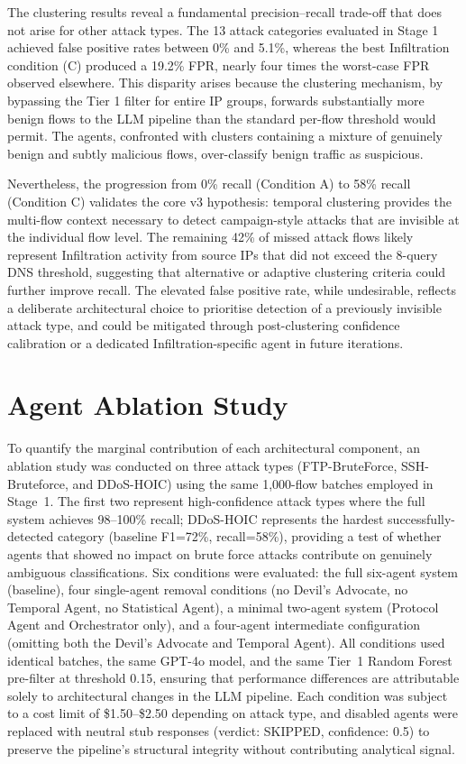 \documentclass[../main.tex]{subfiles}
\begin{document}
The clustering results reveal a fundamental precision--recall trade-off that does not arise for other attack types. The 13 attack categories evaluated in Stage 1 achieved false positive rates between 0\% and 5.1\%, whereas the best Infiltration condition (C) produced a 19.2\% FPR, nearly four times the worst-case FPR observed elsewhere. This disparity arises because the clustering mechanism, by bypassing the Tier 1 filter for entire IP groups, forwards substantially more benign flows to the LLM pipeline than the standard per-flow threshold would permit. The agents, confronted with clusters containing a mixture of genuinely benign and subtly malicious flows, over-classify benign traffic as suspicious.

Nevertheless, the progression from 0\% recall (Condition A) to 58\% recall (Condition C) validates the core v3 hypothesis: temporal clustering provides the multi-flow context necessary to detect campaign-style attacks that are invisible at the individual flow level. The remaining 42\% of missed attack flows likely represent Infiltration activity from source IPs that did not exceed the 8-query DNS threshold, suggesting that alternative or adaptive clustering criteria could further improve recall. The elevated false positive rate, while undesirable, reflects a deliberate architectural choice to prioritise detection of a previously invisible attack type, and could be mitigated through post-clustering confidence calibration or a dedicated Infiltration-specific agent in future iterations.

\section{Agent Ablation Study}
\label{sec:agent-ablation}

To quantify the marginal contribution of each architectural component, an ablation study was conducted on three attack types (FTP-BruteForce, SSH-Bruteforce, and DDoS-HOIC) using the same 1{,}000-flow batches employed in Stage~1. The first two represent high-confidence attack types where the full system achieves 98--100\% recall; DDoS-HOIC represents the hardest successfully-detected category (baseline F1=72\%, recall=58\%), providing a test of whether agents that showed no impact on brute force attacks contribute on genuinely ambiguous classifications. Six conditions were evaluated: the full six-agent system (baseline), four single-agent removal conditions (no Devil's Advocate, no Temporal Agent, no Statistical Agent), a minimal two-agent system (Protocol Agent and Orchestrator only), and a four-agent intermediate configuration (omitting both the Devil's Advocate and Temporal Agent). All conditions used identical batches, the same GPT-4o model, and the same Tier~1 Random Forest pre-filter at threshold 0.15, ensuring that performance differences are attributable solely to architectural changes in the LLM pipeline. Each condition was subject to a cost limit of \$1.50--\$2.50 depending on attack type, and disabled agents were replaced with neutral stub responses (verdict: SKIPPED, confidence: 0.5) to preserve the pipeline's structural integrity without contributing analytical signal.
\end{document}
